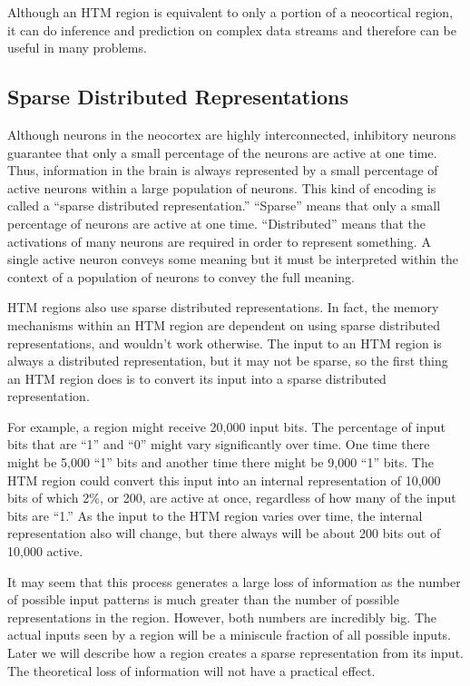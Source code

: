 \documentclass{report}
\begin{document}
Although an HTM region is equivalent to only a portion of a neocortical region, it can do inference and prediction on complex data streams and therefore can be useful in many problems.

\subsection*{Sparse Distributed Representations}

Although neurons in the neocortex are highly interconnected,
inhibitory neurons guarantee that only a small percentage of the
neurons are active at one time. Thus, information in the brain is
always represented by a small percentage of active neurons within a
large population of neurons. This kind of encoding is called a
``sparse distributed representation.'' ``Sparse'' means that only a
small percentage of neurons are active at one time. ``Distributed''
means that the activations of many neurons are required in order to
represent something. A single active neuron conveys some meaning but
it must be interpreted within the context of a population of neurons
to convey the full meaning.

HTM regions also use sparse distributed representations. In fact, the
memory mechanisms within an HTM region are dependent on using sparse
distributed representations, and wouldn't work otherwise. The input to
an HTM region is always a distributed representation, but it may not
be sparse, so the first thing an HTM region does is to convert its
input into a sparse distributed representation.

For example, a region might receive 20,000 input bits. The percentage
of input bits that are ``1'' and ``0'' might vary significantly over
time. One time there might be 5,000 ``1'' bits and another time there
might be 9,000 ``1'' bits. The HTM region could convert this input
into an internal representation of 10,000 bits of which 2\%, or 200,
are active at once, regardless of how many of the input bits are
``1.'' As the input to the HTM region varies over time, the internal
representation also will change, but there always will be about 200
bits out of 10,000 active.

It may seem that this process generates a large loss of information as
the number of possible input patterns is much greater than the number
of possible representations in the region. However, both numbers are
incredibly big. The actual inputs seen by a region will be a miniscule
fraction of all possible inputs. Later we will describe how a region
creates a sparse representation from its input. The theoretical loss
of information will not have a practical effect.
\end{document}
